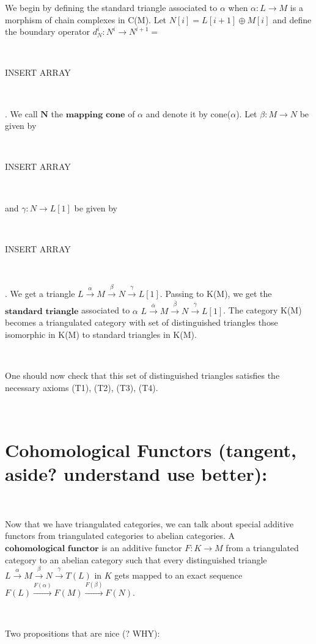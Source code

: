 \documentclass[12pt]{amsart}    %
\theoremstyle{definition}
\begin{document}
We begin by defining the standard triangle associated to $\alpha$ when $\alpha: L \rightarrow M$ is a morphism of chain complexes in C(M).  Let $N[i] = L[i+1]\oplus M[i]$ and define the boundary operator $d_N^i: N^i \rightarrow N^{i+1} = $ 

\

INSERT ARRAY

\

.  We call $\textbf{N}$ the $\textbf{mapping cone}$ of $\alpha$ and denote it by cone($\alpha$).  Let $\beta: M \rightarrow N$ be given by 

\

INSERT ARRAY

\

 and $\gamma: N \rightarrow L[1]$ be given by 
 
 \
 
 INSERT ARRAY
 
 \
 
 .  We get a triangle $L \xrightarrow{\alpha} M \xrightarrow{\beta} N \xrightarrow{\gamma} L[1]$. Passing to K(M), we get the $\textbf{standard triangle}$ associated to $\alpha$ $L \xrightarrow{\overline{\alpha}} M \xrightarrow{\overline{\beta}} N \xrightarrow{\overline{\gamma}} L[1]$.  The category K(M) becomes a triangulated category with set of distinguished triangles those isomorphic in K(M) to standard triangles in K(M).  

\

One should now check that this set of distinguished triangles satisfies the necessary axioms (T1), (T2), (T3), (T4).

\

\section{Cohomological Functors (tangent, aside? understand use better):}

\

Now that we have triangulated categories, we can talk about special additive functors from triangulated categories to abelian categories.  A $\textbf{cohomological functor}$ is an additive functor $F: K \rightarrow M$ from a triangulated category to an abelian category such that every distinguished triangle $L \xrightarrow{\alpha} M \xrightarrow{\beta} N \xrightarrow{\gamma} T(L)$ in $K$ gets mapped to an exact sequence $F(L) \xrightarrow{F(\alpha)} F(M) \xrightarrow{F(\beta)} F(N)$. 

\

Two propositions that are nice (? WHY):
\
\end{document}
